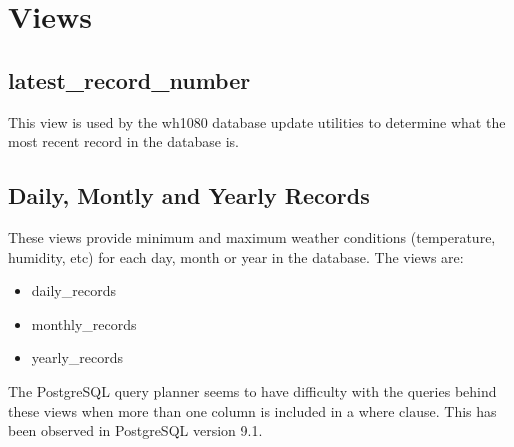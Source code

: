 \documentclass[a4paper,10pt]{book}
\begin{document}
\chapter{Views}
\label{cha_views}

\section{latest\_record\_number}
This view is used by the wh1080 database update utilities to determine what the most recent record in the database is.

\section{Daily, Montly and Yearly Records}
These views provide minimum and maximum weather conditions (temperature, humidity, etc) for each day, month or year in the database. The views are:
\begin{itemize}
\item daily\_records
\item monthly\_records
\item yearly\_records
\end{itemize}

The PostgreSQL query planner seems to have difficulty with the queries behind these views when more than one column is included in a where clause. This has been observed in PostgreSQL version 9.1.
\end{document}
